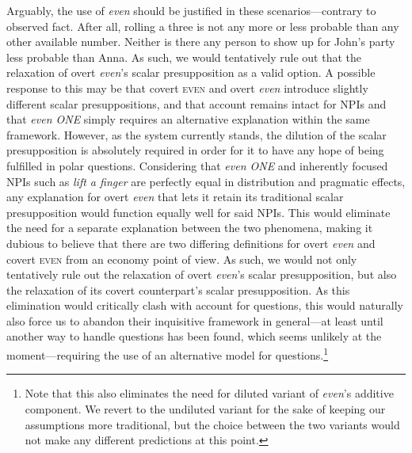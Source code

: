 Arguably, the use of \textit{even} should be justified in these scenarios---contrary to observed fact. After all, rolling a three is not any more or less probable than any other available number. Neither is there any person to show up for John's party less probable than Anna. As such, we would tentatively rule out that the relaxation of overt \textit{even}'s scalar presupposition as a valid option. A possible response to this may be that covert {\scshape even} and overt \textit{even} introduce slightly different scalar presuppositions, and that  account remains intact for NPIs and that \textit{even ONE} simply requires an alternative explanation within the same framework. However, as the system currently stands, the dilution of the scalar presupposition is absolutely required in order for it to have any hope of being fulfilled in polar questions. Considering that \textit{even ONE} and inherently focused NPIs such as \textit{lift a finger} are perfectly equal in distribution and pragmatic effects, any explanation for overt \textit{even} that lets it retain its traditional scalar presupposition would function equally well for said NPIs. This would eliminate the need for a separate explanation between the two phenomena, making it dubious to believe that there are two differing definitions for overt \textit{even} and covert {\scshape even} from an economy point of view. As such, we would not only tentatively rule out the relaxation of overt \textit{even}'s scalar presupposition, but also the relaxation of its covert counterpart's scalar presupposition. As this elimination would critically clash with  account for questions, this would naturally also force us to abandon their inquisitive framework in general---at least until another way to handle questions has been found, which seems unlikely at the moment---requiring the use of an alternative model for questions.\footnote{Note that this also eliminates the need for  diluted variant of \textit{even}'s additive component. We revert to the undiluted variant for the sake of keeping our assumptions more traditional, but the choice between the two variants would not make any different predictions at this point.}


